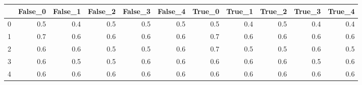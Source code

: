 \begin{tabular}{lrrrrrrrrrr}
\toprule
{} &  False\_0 &  False\_1 &  False\_2 &  False\_3 &  False\_4 &  True\_0 &  True\_1 &  True\_2 &  True\_3 &  True\_4 \\ \hline
\midrule
0 &      0.5 &      0.4 &      0.5 &      0.5 &      0.5 &     0.5 &     0.4 &     0.5 &     0.4 &     0.4 \\ \hline
1 &      0.7 &      0.6 &      0.6 &      0.6 &      0.6 &     0.7 &     0.6 &     0.6 &     0.6 &     0.6 \\ \hline
2 &      0.6 &      0.6 &      0.5 &      0.5 &      0.6 &     0.7 &     0.5 &     0.5 &     0.6 &     0.5 \\ \hline
3 &      0.6 &      0.5 &      0.5 &      0.6 &      0.6 &     0.6 &     0.6 &     0.6 &     0.5 &     0.6 \\ \hline
4 &      0.6 &      0.6 &      0.6 &      0.6 &      0.6 &     0.6 &     0.6 &     0.6 &     0.6 &     0.6 \\ \hline
\bottomrule
\end{tabular}
